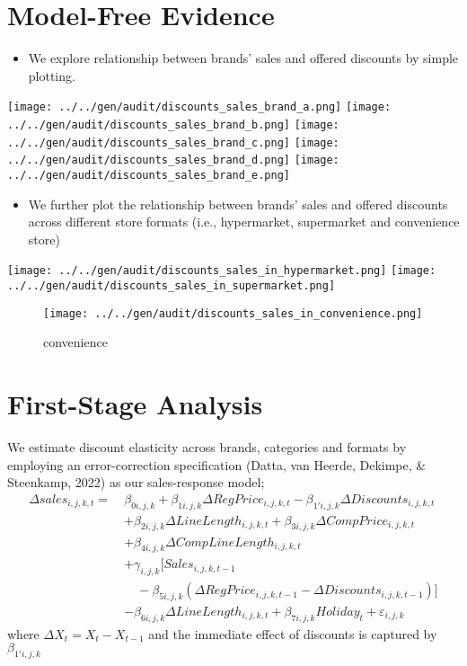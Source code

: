 \documentclass[
]{article}
\providecommand{\tightlist}{%
  \setlength{\itemsep}{0pt}\setlength{\parskip}{0pt}}
\begin{document}
\newpage

\section{Model-Free Evidence}

\begin{itemize}
\tightlist
\item
  We explore relationship between brands' sales and offered discounts by
  simple plotting.
\end{itemize}

\texttt{[image: ../../gen/audit/discounts\_sales\_brand\_a.png]}
\texttt{[image: ../../gen/audit/discounts\_sales\_brand\_b.png]}
\texttt{[image: ../../gen/audit/discounts\_sales\_brand\_c.png]}
\texttt{[image: ../../gen/audit/discounts\_sales\_brand\_d.png]}
\texttt{[image: ../../gen/audit/discounts\_sales\_brand\_e.png]}

\begin{itemize}
\tightlist
\item
  We further plot the relationship between brands' sales and offered
  discounts across different store formats (i.e., hypermarket,
  supermarket and convenience store)
\end{itemize}

\texttt{[image: ../../gen/audit/discounts\_sales\_in\_hypermarket.png]}
\texttt{[image: ../../gen/audit/discounts\_sales\_in\_supermarket.png]}

\begin{figure}
\centering
\texttt{[image: ../../gen/audit/discounts\_sales\_in\_convenience.png]}
\caption{convenience}
\end{figure}

\newpage
\section{First-Stage Analysis}

We estimate discount elasticity across brands, categories and formats by
employing an error-correction specification (Datta, van Heerde, Dekimpe,
\& Steenkamp, 2022) as our sales-response model; \begin{align*}
\Delta sales_{i,j,k,t} =\ &\beta_{0i,j,k} + \beta_{1i,j,k}\Delta RegPrice_{i,j,k,t} - \beta_{1'i,j,k}\Delta Discounts_{i,j,k,t} \nonumber \\
&+ \beta_{2i,j,k}\Delta LineLength_{i,j,k,t} \nonumber + \beta_{3i,j,k}\Delta CompPrice_{i,j,k,t} \nonumber \\
&+ \beta_{4i,j,k}\Delta CompLineLength_{i,j,k,t} \nonumber \\
&+ \gamma_{i,j,k}[Sales_{i,j,k,t-1} \nonumber \\
&\quad - \beta_{5i,j,k}(\Delta RegPrice_{i,j,k,t-1} - \Delta Discounts_{i,j,k,t-1})] \nonumber \\
&- \beta_{6i,j,k}\Delta LineLength_{i,j,k,t} \nonumber + \beta_{7i,j,k}Holiday_{t} + \varepsilon_{i,j,k}
\end{align*} where \(\Delta X_{t} = X_{t} - X_{t-1}\) and the immediate
effect of discounts is captured by \(\beta_{1'i,j,k}\)
\end{document}
